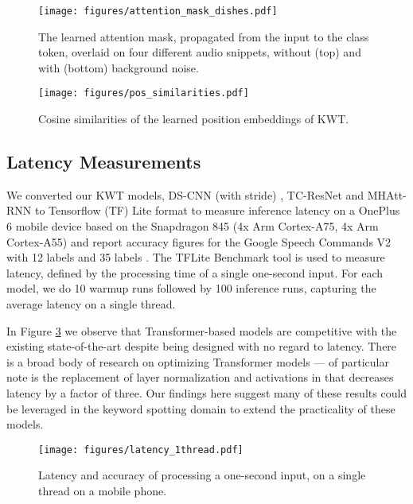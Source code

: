 \documentclass[a4paper]{article}
\begin{document}
\begin{figure}[t]
  \centering
  \texttt{[image: figures/attention\_mask\_dishes.pdf]}
  \caption{The learned attention mask, propagated from the input to the class token, overlaid on four different audio snippets, without (top) and with (bottom) background noise.}
  \label{fig:mask}
\end{figure}

\begin{figure}[b]
  \centering
  \texttt{[image: figures/pos\_similarities.pdf]}
  \caption{Cosine similarities of the learned position embeddings of KWT.}
  \label{fig:pos_similar}
\end{figure}

\subsection{Latency Measurements}

We converted our KWT models, DS-CNN (with stride) \cite{zhang2017hello}, TC-ResNet \cite{choi2019temporal} and MHAtt-RNN \cite{rybakov2020streaming} to Tensorflow (TF) Lite format to measure inference latency on a OnePlus 6 mobile device based on the Snapdragon 845 (4x Arm Cortex-A75, 4x Arm Cortex-A55) and report accuracy figures for the Google Speech Commands V2 with 12 labels and 35 labels \cite{speechv2,rybakov2020streaming}. The TFLite Benchmark tool \cite{TFLite_benchmark} is used to measure latency, defined by the processing time of a single one-second input. For each model, we do 10 warmup runs followed by 100 inference runs, capturing the average latency on a single thread.

In Figure \ref{fig:latency} we observe that Transformer-based models are competitive with the existing state-of-the-art despite being designed with no regard to latency. There is a broad body of research on optimizing Transformer models --- of particular note is the replacement of layer normalization and activations in \cite{sun2020mobilebert} that decreases latency by a factor of three. Our findings here suggest  many of these results could be leveraged in the keyword spotting domain to extend the practicality of these models.

\begin{figure}[t]
    \centering
    \texttt{[image: figures/latency\_1thread.pdf]}
    \caption{Latency and accuracy of processing a one-second input, on a single thread on a mobile phone.}
    \label{fig:latency}
  \end{figure}
\end{document}
